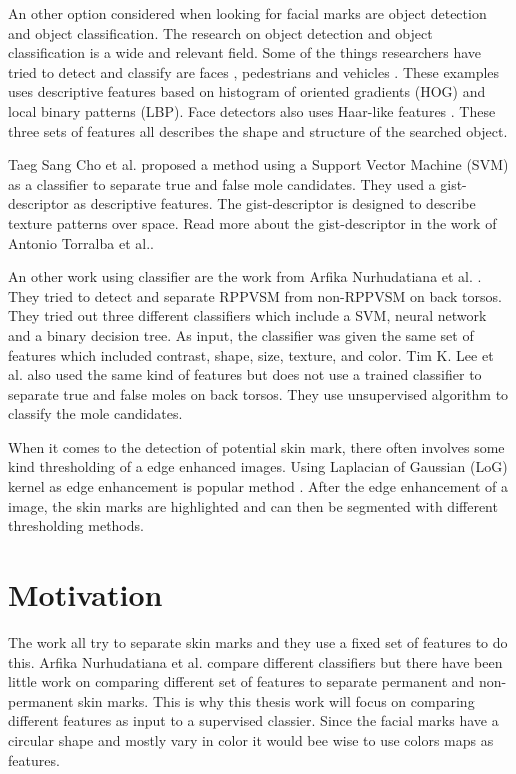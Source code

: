An other option considered when looking for facial marks are object detection and object classification.
The research on object detection and object classification is a wide and relevant field. Some of the things researchers have tried to detect and classify are faces \cite{facedetection_LBP}, pedestrians \cite{pedestrian_detection} and vehicles \cite{vehicle_hog}. These examples uses descriptive features based on histogram of oriented gradients (HOG) and local binary patterns (LBP). Face detectors also uses Haar-like features \cite{face_detection}. These three sets of features all describes the shape and structure of the searched object.

Taeg Sang Cho et al.\cite{reliable_mole} proposed a method using a Support Vector Machine (SVM) as a classifier to separate true and false mole candidates. They used a gist-descriptor as descriptive features. The gist-descriptor is designed to describe texture patterns over space. Read more about the gist-descriptor in the work of Antonio Torralba et al.\cite{gist_descriptor}. 

An other work using classifier are the work from Arfika Nurhudatiana et al. \cite{torso_RPPVSM}. They tried to detect and separate RPPVSM from non-RPPVSM on back torsos. They tried out three different classifiers which include a SVM, neural network and a binary decision tree. As input, the classifier was given the same set of features which included contrast, shape, size, texture, and color. Tim K. Lee et al.\cite{torso_mole} also used the same kind of features but does not use a trained classifier to separate true and false moles on back torsos. They use unsupervised algorithm to classify the mole candidates. 

When it comes to the detection of potential skin mark, there often involves some kind thresholding of a edge enhanced images. Using Laplacian of Gaussian (LoG) kernel as edge enhancement is popular method \cite{tattoos,face_matching}. After the edge enhancement of a image, the skin marks are highlighted and can then be segmented with different thresholding methods. 

\section{Motivation}

The work \cite{reliable_mole,torso_RPPVSM,torso_mole} all try to separate skin marks and they use a fixed set of features to do this. Arfika Nurhudatiana et al. compare different classifiers but there have been little work on comparing different set of features to separate permanent and non-permanent skin marks. This is why this thesis work will focus on comparing different features as input to a supervised classier. Since the facial marks have a circular shape and mostly vary in color it would bee wise to use colors maps as features. 

